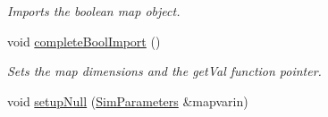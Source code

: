 \begin{DoxyCompactItemize}
\begin{DoxyCompactList}\small\item\em Imports the boolean map object. \end{DoxyCompactList}\item 
void \hyperlink{class_data_mask_a09a24a15ad49851e8f344150a9109dd2}{complete\+Bool\+Import} ()\hypertarget{class_data_mask_a09a24a15ad49851e8f344150a9109dd2}{}\label{class_data_mask_a09a24a15ad49851e8f344150a9109dd2}

\begin{DoxyCompactList}\small\item\em Sets the map dimensions and the get\+Val function pointer. \end{DoxyCompactList}\item 
void \hyperlink{class_data_mask_a8a1071a51c4114cda3f73eeb98992fb4}{setup\+Null} (\hyperlink{struct_sim_parameters}{Sim\+Parameters} \&mapvarin)\hypertarget{class_data_mask_a8a1071a51c4114cda3f73eeb98992fb4}{}\label{class_data_mask_a8a1071a51c4114cda3f73eeb98992fb4}


\end{DoxyCompactItemize}
